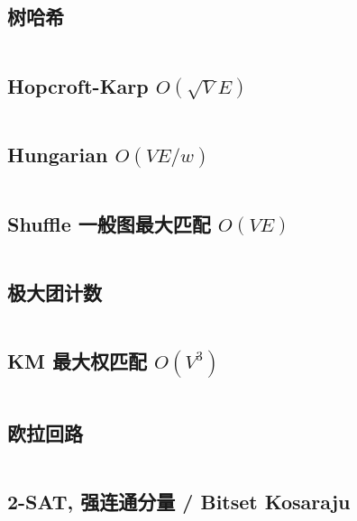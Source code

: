 \documentclass[titlepage, a4paper, 11pt]{article}
\begin{document}
\begin{spacing}{1.15}
				\subsection{树哈希}
					
					\inputminted{cpp}{src/TreeandGraph/tree_hash.cpp}
				\subsection{Hopcroft-Karp $O(\sqrt{V} E)$}
					\inputminted[highlightlines={5,9}]{cpp}{src/TreeandGraph/hk_skip2004.cpp}
				\subsection{Hungarian $O(V E / w)$}
					\inputminted{cpp}{src/TreeandGraph/Hungarian.cpp}
				\subsection{Shuffle 一般图最大匹配 $O(V E)$}
					\inputminted{cpp}{src/TreeandGraph/一般图最大匹配-shuffle.cpp}
				\subsection{极大团计数}
					\inputminted{cpp}{src/TreeandGraph/CliqueCount.cpp}
				\subsection{KM 最大权匹配 $O(V^3)$}
					\inputminted{cpp}{src/TreeandGraph/KM.cpp}
				\subsection{欧拉回路}
				\inputminted{cpp}{src/TreeandGraph/欧拉回路.cpp}
				\subsection{2-SAT, 强连通分量 / Bitset Kosaraju}
					\inputminted{cpp}{src/TreeandGraph/2-sat.cpp}
					\inputminted{cpp}{src/TreeandGraph/kosaraju.cpp}

\end{spacing}
\end{document}
